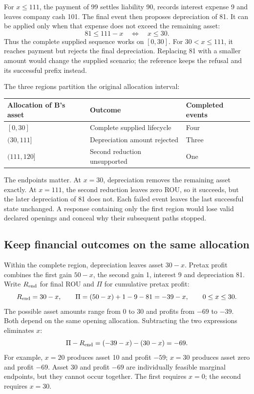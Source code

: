 For $x\leq111$, the payment of 99 settles liability 90, records interest expense
9 and leaves company cash 101. The final event then proposes depreciation of
81. It can be applied only when that expense does not exceed the remaining
asset:
\[
  81\leq111-x\quad\Longleftrightarrow\quad x\leq30.
\]
Thus the complete supplied sequence works on $[0,30]$. For $30<x\leq111$, it
reaches payment but rejects the final depreciation. Replacing 81 with a smaller
amount would change the supplied scenario; the reference keeps the refusal and
its successful prefix instead.

The three regions partition the original allocation interval:
\begin{center}
\begin{tabular}{lll}
\toprule
Allocation of B's asset & Outcome & Completed events \\
\midrule
$[0,30]$ & Complete supplied lifecycle & Four \\
$(30,111]$ & Depreciation amount rejected & Three \\
$(111,120]$ & Second reduction unsupported & One \\
\bottomrule
\end{tabular}
\end{center}
The endpoints matter. At $x=30$, depreciation removes the remaining asset
exactly. At $x=111$, the second reduction leaves zero ROU, so it succeeds, but
the later depreciation of 81 does not. Each failed event leaves the last
successful state unchanged. A response containing only the first region would
lose valid declared openings and conceal why their subsequent paths stopped.

\subsection{Keep financial outcomes on the same allocation}

Within the complete region, depreciation leaves asset $30-x$. Pretax profit
combines the first gain $50-x$, the second gain 1, interest 9 and depreciation
81. Write $R_{\rm end}$ for final ROU and $\Pi$ for cumulative pretax profit:
\[
  R_{\rm end}=30-x,\qquad
  \Pi=(50-x)+1-9-81=-39-x,\qquad 0\leq x\leq30.
\]
The possible asset amounts range from 0 to 30 and profits from $-69$ to $-39$.
Both depend on the same opening allocation. Subtracting the two expressions
eliminates $x$:
\[
  \Pi-R_{\rm end}=(-39-x)-(30-x)=-69.
\]
For example, $x=20$ produces asset 10 and profit $-59$; $x=30$ produces asset
zero and profit $-69$. Asset 30 and profit $-69$ are individually feasible
marginal endpoints, but they cannot occur together. The first requires $x=0$;
the second requires $x=30$.

